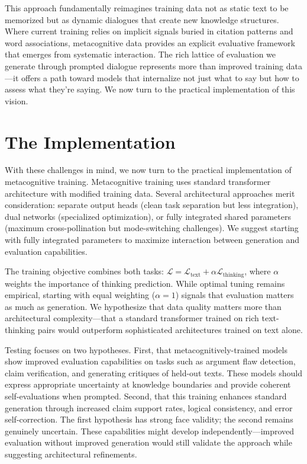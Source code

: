 \documentclass[11pt]{article}
\begin{document}
	This approach fundamentally reimagines training data not as static text to be memorized but as dynamic dialogues that create new knowledge structures. Where current training relies on implicit signals buried in citation patterns and word associations, metacognitive data provides an explicit evaluative framework that emerges from systematic interaction. The rich lattice of evaluation we generate through prompted dialogue represents more than improved training data—it offers a path toward models that internalize not just what to say but how to assess what they're saying. We now turn to the practical implementation of this vision.
	
	\section{The Implementation}
	
	With these challenges in mind, we now turn to the practical implementation of metacognitive training. Metacognitive training uses standard transformer architecture with modified training data. Several architectural approaches merit consideration: separate output heads (clean task separation but less integration), dual networks (specialized optimization), or fully integrated shared parameters (maximum cross-pollination but mode-switching challenges). We suggest starting with fully integrated parameters to maximize interaction between generation and evaluation capabilities.
	
	The training objective combines both tasks: $\mathcal{L} = \mathcal{L}_{\text{text}} + \alpha \mathcal{L}_{\text{thinking}}$, where $\alpha$ weights the importance of thinking prediction. While optimal tuning remains empirical, starting with equal weighting ($\alpha = 1$) signals that evaluation matters as much as generation. We hypothesize that data quality matters more than architectural complexity---that a standard transformer trained on rich text-thinking pairs would outperform sophisticated architectures trained on text alone.
	
	Testing focuses on two hypotheses. First, that metacognitively-trained models show improved evaluation capabilities on tasks such as argument flaw detection, claim verification, and generating critiques of held-out texts. These models should express appropriate uncertainty at knowledge boundaries and provide coherent self-evaluations when prompted. Second, that this training enhances standard generation through increased claim support rates, logical consistency, and error self-correction. The first hypothesis has strong face validity; the second remains genuinely uncertain. These capabilities might develop independently---improved evaluation without improved generation would still validate the approach while suggesting architectural refinements.
\end{document}

